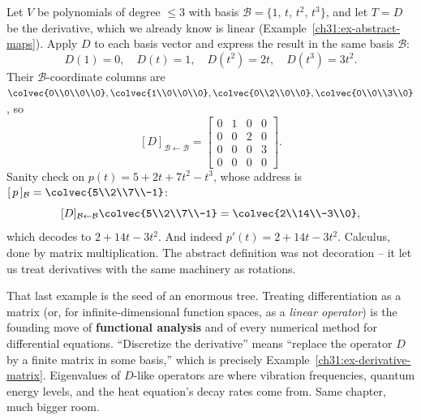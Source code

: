 \begin{example}
\label{ch31:ex-derivative-matrix}
Let $V$ be polynomials of degree $\le 3$ with basis
$\mathcal{B}=\{1,\,t,\,t^2,\,t^3\}$, and let $T=D$ be the derivative, which we
already know is linear (Example~\ref{ch31:ex-abstract-maps}). Apply $D$ to each
basis vector and express the result in the same basis $\mathcal{B}$:
\[
  D(1)=0,\quad D(t)=1,\quad D(t^2)=2t,\quad D(t^3)=3t^2.
\]
Their $\mathcal{B}$-coordinate columns are
$\colvec{0\\0\\0\\0},\colvec{1\\0\\0\\0},\colvec{0\\2\\0\\0},\colvec{0\\0\\3\\0}$,
so
\[
  [D]_{\mathcal{B}\leftarrow\mathcal{B}}
  = \begin{bmatrix} 0 & 1 & 0 & 0\\ 0 & 0 & 2 & 0\\ 0 & 0 & 0 & 3\\ 0 & 0 & 0 & 0\end{bmatrix}.
\]
Sanity check on $p(t)=5 + 2t + 7t^2 - t^3$, whose address is
$[\,p\,]_{\mathcal{B}}=\colvec{5\\2\\7\\-1}$:
\[
  [D]_{\mathcal{B}\leftarrow\mathcal{B}}\colvec{5\\2\\7\\-1}
  = \colvec{2\\14\\-3\\0},
\]
which decodes to $2 + 14t - 3t^2$. And indeed $p'(t) = 2 + 14t - 3t^2$. Calculus,
done by matrix multiplication. The abstract definition was not decoration -- it
let us treat derivatives with the same machinery as rotations.
\end{example}

\begin{connectionbox}
That last example is the seed of an enormous tree. Treating differentiation as a
matrix (or, for infinite-dimensional function spaces, as a \emph{linear
operator}) is the founding move of \textbf{functional analysis} and of every
numerical method for differential equations. ``Discretize the derivative'' means
``replace the operator $D$ by a finite matrix in some basis,'' which is precisely
Example~\ref{ch31:ex-derivative-matrix}. Eigenvalues of $D$-like operators are
where vibration frequencies, quantum energy levels, and the heat equation's decay
rates come from. Same chapter, much bigger room.
\end{connectionbox}

